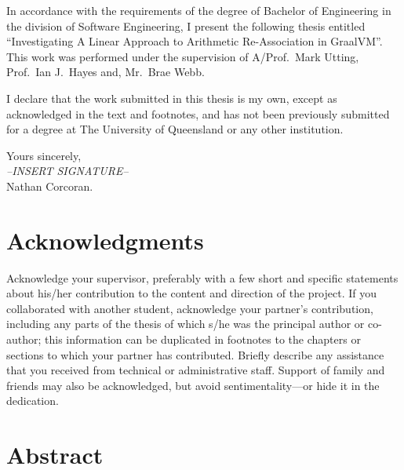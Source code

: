 \documentclass[12pt,openany,a4paper]{book}
\begin{document}
In accordance with the requirements of the degree of Bachelor of
Engineering in the division of 
Software Engineering,
I present the
following thesis entitled ``Investigating A Linear Approach
to Arithmetic Re-Association in GraalVM''.  
This work was performed under the supervision of
A/Prof.\ Mark Utting, Prof.\ Ian J.\ Hayes and, Mr.\ Brae Webb.

I declare that the work submitted in this thesis is my own, except as
acknowledged in the text and footnotes, and has not been previously
submitted for a degree at The University of Queensland or any other
institution.

\begin{flushright}
	Yours sincerely,\\
	\medskip
	\emph{--INSERT SIGNATURE--}\\
	\medskip
	Nathan Corcoran.
\end{flushright}

\cleardoublepage

\chapter{Acknowledgments}

Acknowledge your supervisor, preferably with a few short and specific
statements about his/her contribution to the content and direction of
the project.  If you collaborated with another student, acknowledge
your partner's contribution, including any parts of the thesis of
which s/he was the principal author or co-author; this information can
be duplicated in footnotes to the chapters or sections to which your
partner has contributed.  Briefly describe any assistance that you
received from technical or administrative staff.  Support of family
and friends may also be acknowledged, but avoid sentimentality---or
hide it in the dedication.

\cleardoublepage

\chapter{Abstract}

\tableofcontents

\listoffigures
{}

\listoftables
{}

% 
\end{document}
